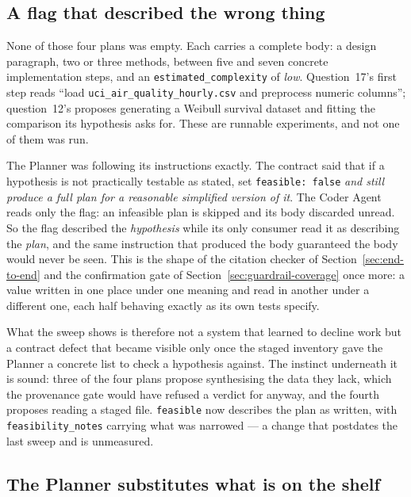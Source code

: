 \subsection{A flag that described the wrong thing}
\label{sec:feasible-flag}

None of those four plans was empty. Each carries a complete body: a design
paragraph, two or three methods, between five and seven concrete implementation
steps, and an \texttt{estimated\_complexity} of \emph{low}. Question~17's first
step reads ``load \texttt{uci\_air\_quality\_hourly.csv} and preprocess numeric
columns''; question~12's proposes generating a Weibull survival dataset and
fitting the comparison its hypothesis asks for. These are runnable experiments,
and not one of them was run.

The Planner was following its instructions exactly. The contract said that if a
hypothesis is not practically testable as stated, set \texttt{feasible: false}
\emph{and still produce a full plan for a reasonable simplified version of it}.
The Coder Agent reads only the flag: an infeasible plan is skipped and its body
discarded unread. So the flag described the \emph{hypothesis} while its only
consumer read it as describing the \emph{plan}, and the same instruction that
produced the body guaranteed the body would never be seen. This is the shape of
the citation checker of Section~\ref{sec:end-to-end} and the confirmation gate of
Section~\ref{sec:guardrail-coverage} once more: a value written in one place under
one meaning and read in another under a different one, each half behaving exactly
as its own tests specify.

What the sweep shows is therefore not a system that learned to decline work but a
contract defect that became visible only once the staged inventory gave the Planner
a concrete list to check a hypothesis against. The instinct underneath it is sound:
three of the four plans propose synthesising the data they lack, which the
provenance gate would have refused a verdict for anyway, and the fourth proposes
reading a staged file. \texttt{feasible} now describes the plan as written, with
\texttt{feasibility\_notes} carrying what was narrowed --- a change that postdates
the last sweep and is unmeasured.

\subsection{The Planner substitutes what is on the shelf}
\label{sec:planner-substitution}

